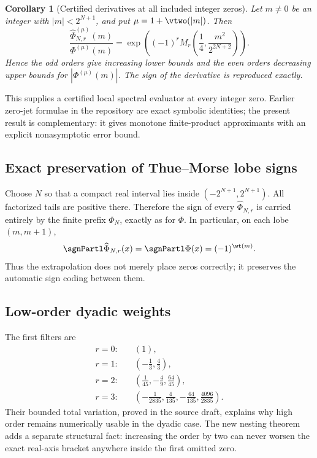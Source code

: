 \documentclass[11pt]{article}
\numberwithin{equation}{section}
\newtheorem{corollary}[theorem]{Corollary}
\theoremstyle{definition}
\theoremstyle{remark}
\begin{document}
\begin{corollary}[Certified derivatives at all included integer zeros]\label{p3:cor:integer-jets}
Let $m\ne0$ be an integer with $|m|<2^{N+1}$, and put
$\mu=1+\vtwo(|m|)$.  Then
\begin{equation}
 \frac{\widehat\Phi_{N,r}^{(\mu)}(m)}{\Phi^{(\mu)}(m)}
 =\exp\!\left((-1)^rM_r\!\left(\frac14,\frac{m^2}{2^{2N+2}}\right)\right).
 \label{p3:eq:dyadic-derivative-ratio}
\end{equation}
Hence the odd orders give increasing lower bounds and the even orders decreasing upper
bounds for $|\Phi^{(\mu)}(m)|$.  The sign of the derivative is reproduced exactly.
\end{corollary}

This supplies a certified local spectral evaluator at every integer zero.  Earlier zero-jet
formulae in the repository are exact symbolic identities; the present result is complementary:
it gives monotone finite-product approximants with an explicit nonasymptotic error bound.

\subsection{Exact preservation of Thue--Morse lobe signs}

Choose $N$ so that a compact real interval lies inside $(-2^{N+1},2^{N+1})$.  All factorized
tails are positive there.  Therefore the sign of every $\widehat\Phi_{N,r}$ is carried
entirely by the finite prefix $\Phi_N$, exactly as for $\Phi$.  In particular, on each lobe
$(m,m+1)$,
\begin{equation}
 \sgnPartl\widehat\Phi_{N,r}(x)=\sgnPartl\Phi(x)=(-1)^{\wt(m)}.
 \label{p3:eq:TM-sign-preserved}
\end{equation}
Thus the extrapolation does not merely place zeros correctly; it preserves the automatic
sign coding between them.

\subsection{Low-order dyadic weights}

The first filters are
\begin{align*}
 r=0:&\quad (1),\\
 r=1:&\quad \left(-\frac13,\frac43\right),\\
 r=2:&\quad \left(\frac1{45},-\frac49,\frac{64}{45}\right),\\
 r=3:&\quad \left(-\frac1{2835},\frac4{135},-\frac{64}{135},
                  \frac{4096}{2835}\right).
\end{align*}
Their bounded total variation, proved in the source draft, explains why high order remains
numerically usable in the dyadic case.  The new nesting theorem adds a separate structural
fact: increasing the order by two can never worsen the exact real-axis bracket anywhere
inside the first omitted zero.
\end{document}
